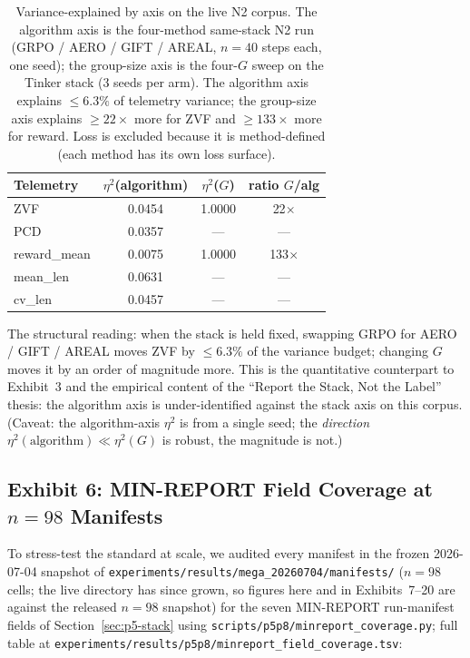 \documentclass{article}  \usepackage[preprint,nonatbib]{neurips_2026} \usepackage[numbers]{natbib}
\providecommand{\secref}[1]{Section~\ref{#1}}
\begin{document}
\begin{table}[t]
\centering
\caption{Variance-explained by axis on the live N2 corpus. The algorithm
axis is the four-method same-stack N2 run (GRPO / AERO / GIFT / AREAL,
$n=40$ steps each, one seed); the group-size axis is the four-$G$ sweep on
the Tinker stack (3 seeds per arm). The algorithm axis explains $\le 6.3\%$
of telemetry variance; the group-size axis explains $\ge 22\times$ more for
ZVF and $\ge 133\times$ more for reward. Loss is excluded because it is
method-defined (each method has its own loss surface).}
\label{tab:p5-eta2}
\small
\begin{tabular}{@{}lccc@{}}
\toprule
Telemetry & $\eta^{2}$(algorithm) & $\eta^{2}$($G$) & ratio $G$/alg \\
\midrule
ZVF       & 0.0454 & 1.0000 & 22$\times$  \\
PCD       & 0.0357 & ---    & ---    \\
reward\_mean & 0.0075 & 1.0000 & 133$\times$ \\
mean\_len  & 0.0631 & ---    & ---    \\
cv\_len    & 0.0457 & ---    & ---    \\
\bottomrule
\end{tabular}
\end{table}

The structural reading: when the stack is held fixed, swapping GRPO for
AERO / GIFT / AREAL moves ZVF by $\le 6.3\%$ of the variance budget;
changing $G$ moves it by an order of magnitude more. This is the
quantitative counterpart to Exhibit~3 and the empirical content of the
``Report the Stack, Not the Label'' thesis: the algorithm axis is
under-identified against the stack axis on this corpus. (Caveat: the
algorithm-axis $\eta^{2}$ is from a single seed; the \emph{direction}
$\eta^{2}(\text{algorithm}) \ll \eta^{2}(G)$ is robust, the magnitude
is not.)

\subsection{Exhibit 6: MIN-REPORT Field Coverage at $n=98$ Manifests}
\label{sec:p5-exhibit-coverage}
To stress-test the standard at scale, we audited every manifest in the frozen
2026-07-04 snapshot of
\texttt{experiments/results/mega\_20260704/manifests/} ($n=98$ cells; the live
directory has since grown, so figures here and in Exhibits~7--20 are against the
released $n=98$ snapshot) for
the seven MIN-REPORT run-manifest fields of \secref{sec:p5-stack} using
\texttt{scripts/p5p8/minreport\_coverage.py}; full table at
\texttt{experiments/results/p5p8/minreport\_field\_coverage.tsv}:
\end{document}
